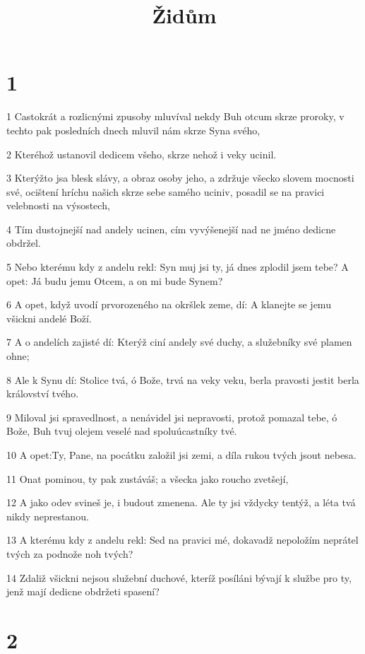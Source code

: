 

\title{Židům}

\chapter{1}

\par 1 Castokrát a rozlicnými zpusoby mluvíval nekdy Buh otcum skrze proroky, v techto pak posledních dnech mluvil nám skrze Syna svého,
\par 2 Kteréhož ustanovil dedicem všeho, skrze nehož i veky ucinil.
\par 3 Kterýžto jsa blesk slávy, a obraz osoby jeho, a zdržuje všecko slovem mocnosti své, ocištení hríchu našich skrze sebe samého uciniv, posadil se na pravici velebnosti na výsostech,
\par 4 Tím dustojnejší nad andely ucinen, cím vyvýšenejší nad ne jméno dedicne obdržel.
\par 5 Nebo kterému kdy z andelu rekl: Syn muj jsi ty, já dnes zplodil jsem tebe? A opet: Já budu jemu Otcem, a on mi bude Synem?
\par 6 A opet, když uvodí prvorozeného na okršlek zeme, dí: A klanejte se jemu všickni andelé Boží.
\par 7 A o andelích zajisté dí: Kterýž ciní andely své duchy, a služebníky své plamen ohne;
\par 8 Ale k Synu dí: Stolice tvá, ó Bože, trvá na veky veku, berla pravosti jestit berla království tvého.
\par 9 Miloval jsi spravedlnost, a nenávidel jsi nepravosti, protož pomazal tebe, ó Bože, Buh tvuj olejem veselé nad spoluúcastníky tvé.
\par 10 A opet:Ty, Pane, na pocátku založil jsi zemi, a díla rukou tvých jsout nebesa.
\par 11 Onat pominou, ty pak zustáváš; a všecka jako roucho zvetšejí,
\par 12 A jako odev svineš je, i budout zmenena. Ale ty jsi vždycky tentýž, a léta tvá nikdy neprestanou.
\par 13 A kterému kdy z andelu rekl: Sed na pravici mé, dokavadž nepoložím neprátel tvých za podnože noh tvých?
\par 14 Zdaliž všickni nejsou služební duchové, kteríž posíláni bývají k službe pro ty, jenž mají dedicne obdržeti spasení?

\chapter{2}

